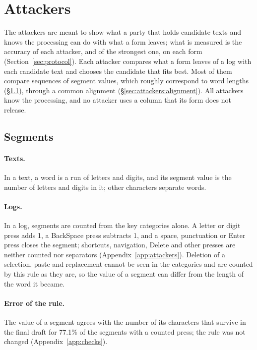 \section{Attackers}
\label{sec:attackers}

The attackers are meant to show what a party that holds candidate texts and knows the processing can do with what a
form leaves; what is measured is the accuracy of each attacker, and of the strongest one, on each form
(Section~\ref{sec:protocol}). Each attacker compares what a form leaves of a log with each candidate text and chooses
the candidate that fits best. Most of them compare sequences of segment values, which roughly correspond to word
lengths (\S\ref{sec:attackers:segments}), through a common alignment (\S\ref{sec:attackers:alignment}). All attackers
know the processing, and no attacker uses a column that its form does not release.

\subsection{Segments}
\label{sec:attackers:segments}

\paragraph{Texts.}
In a text, a word is a run of letters and digits, and its segment value is the number of letters and digits in it;
other characters separate words.

\paragraph{Logs.}
In a log, segments are counted from the key categories alone. A letter or digit press adds 1, a BackSpace press
subtracts 1, and a space, punctuation or Enter press closes the segment; shortcuts, navigation, Delete and other presses
are neither counted nor separators (Appendix~\ref{app:attackers}). Deletion of a selection, paste and replacement cannot be seen in the categories
and are counted by this rule as they are, so the value of a segment can differ from the length of the word it became.

\paragraph{Error of the rule.}
The value of a segment agrees with the number of its characters that survive in the final draft for 77.1\% of the
segments with a counted press; the rule was not changed (Appendix~\ref{app:checks}).

